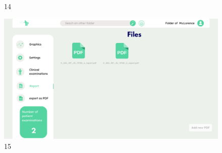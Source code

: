 \begin{figure}[H]
\begin{minipage}{0.3\textwidth}
        \caption*{14}
    \end{minipage}
    \begin{minipage}{0.3\textwidth}
        \centering
        \includegraphics[width=\textwidth]{images/Prototype/15.png}
        \caption*{15}
    \end{minipage}
    \label{fig:plateforme_imaginee}
\end{figure}
